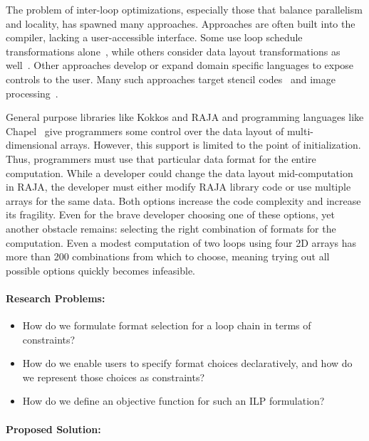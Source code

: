 \documentclass{article}
\begin{document}
The problem of inter-loop optimizations, especially those that balance parallelism and locality, has spawned many approaches. 
Approaches are often built into the compiler, lacking a user-accessible interface.
Some use loop schedule transformations alone~\cite{wolf1991data,mckinley1996improving}, while others consider data layout transformations as well~\cite{cierniak1995unifying,kennedy1995automatic,kandemir1998improving,  chen2005constraint, chen2005integrating, ozturk2011data}.
Other approaches develop or expand domain specific languages to expose controls to the user.
Many such approaches target stencil codes~\cite{henretty2011data,kronawitter2018automatic,luporini2018design} and image processing~\cite{ragan-kelley2013halide,mullapudi2015polymage}.

General purpose libraries like Kokkos and RAJA and programming languages like Chapel~\cite{diaconescu2007approach} give programmers some control over the data layout of multi-dimensional arrays. However, this support is limited to the point of initialization.
Thus, programmers must use that particular data format for the entire computation.
While a developer could change the data layout mid-computation in RAJA, the developer must either modify RAJA library code or use multiple arrays for the same data. 
Both options increase the code complexity and increase its fragility.
Even for the brave developer choosing one of these options, yet another obstacle remains: selecting the right combination of formats for the computation.
Even a modest computation of two loops using four 2D arrays has more than 200 combinations from which to choose, meaning trying out all possible options quickly becomes infeasible. 

\paragraph{Research Problems:}

\begin{itemize}
\item How do we formulate format selection for a loop chain in terms of constraints?
\item How do we enable users to specify format choices declaratively, and how do we represent those choices as constraints?
\item How do we define an objective function for such an ILP formulation?
\end{itemize}

\paragraph{Proposed Solution:}
\end{document}
